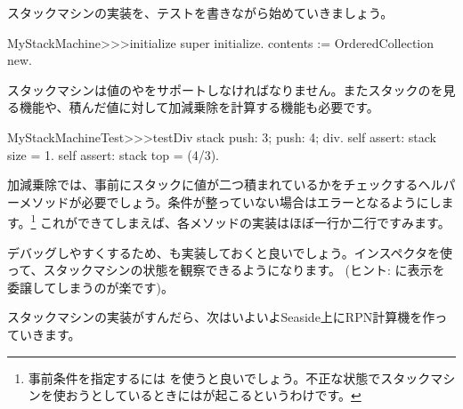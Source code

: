 \documentclass[a4paper,10pt,twoside]{book}
\begin{document}
スタックマシンの実装を、テストを書きながら始めていきましょう。


\begin{code}{}
MyStackMachine>>>initialize
	super initialize.
	contents := OrderedCollection new.
\end{code}

スタックマシンは値のやをサポートしなければなりません。またスタックのを見る機能や、積んだ値に対して加減乗除を計算する機能も必要です。


\begin{code}{}
MyStackMachineTest>>>testDiv
	stack
		push: 3;
		push: 4;
		div.
	self assert: stack size = 1.
	self assert: stack top = (4/3).
\end{code}

加減乗除では、事前にスタックに値が二つ積まれているかをチェックするヘルパーメソッドが必要でしょう。条件が整っていない場合はエラーとなるようにします。\footnote{事前条件を指定するには  を使うと良いでしょう。不正な状態でスタックマシンを使おうとしているときにはが起こるというわけです。}
これができてしまえば、各メソッドの実装はほぼ一行か二行ですみます。

デバッグしやすくするため、も実装しておくと良いでしょう。インスペクタを使って、スタックマシンの状態を観察できるようになります。
(ヒント:  に表示を委譲してしまうのが楽です)。


スタックマシンの実装がすんだら、次はいよいよSeaside上にRPN計算機を作っていきます。
\end{document}
